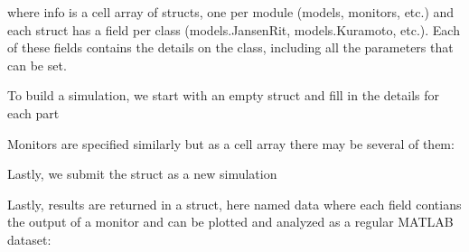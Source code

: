 \noindent where info is a cell array of structs, one per module (models,
monitors, etc.) and each struct has a field per class (models.JansenRit, 
models.Kuramoto, etc.). Each of these fields contains the details on 
the class, including all the parameters that can be set. 

To build a simulation, we start with an empty struct
and fill in the details for each part

%
%
%
%

Monitors are specified similarly but as a cell array there may be
several of them:

%


Lastly, we submit the struct as a new simulation


\noindent Lastly, results are returned in a struct, here named data
where each field contians the output of a monitor and can be plotted
and analyzed as a regular MATLAB dataset:








